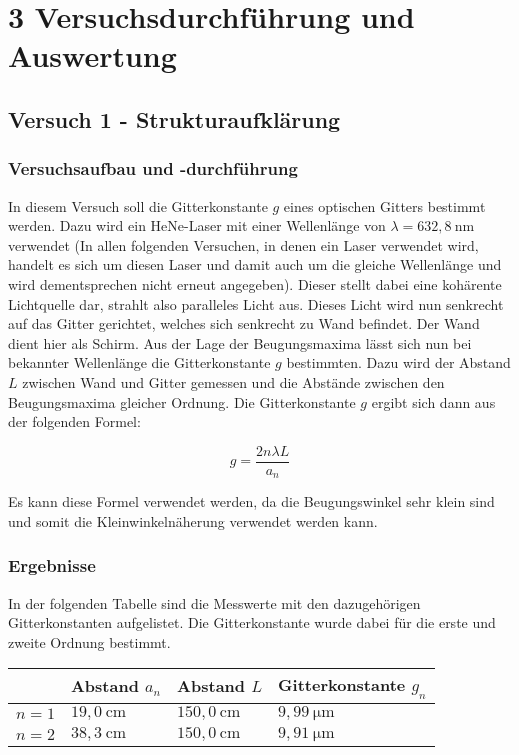 \chapter*{3 Versuchsdurchführung und Auswertung}
\setcounter{chapter}{3}
\setcounter{section}{0}
\setcounter{subsection}{0}

\section{Versuch 1 - Strukturaufklärung}

    \subsection{Versuchsaufbau und -durchführung}

        In diesem Versuch soll die Gitterkonstante $g$ eines optischen Gitters bestimmt werden. Dazu wird ein HeNe-Laser mit einer Wellenlänge von $\lambda = 632,8\ \mathrm{nm}$ verwendet (In allen folgenden Versuchen, in denen ein Laser verwendet wird, handelt es sich um diesen Laser und damit auch um die gleiche Wellenlänge und wird dementsprechen nicht erneut angegeben). Dieser stellt dabei eine kohärente Lichtquelle dar, strahlt also paralleles Licht aus. Dieses
        Licht wird nun senkrecht auf das Gitter gerichtet, welches sich senkrecht zu Wand befindet. Der Wand dient hier als Schirm. Aus der Lage der Beugungsmaxima lässt sich nun bei bekannter Wellenlänge die Gitterkonstante $g$ bestimmten. Dazu wird der Abstand $L$ zwischen Wand und Gitter gemessen und die Abstände zwischen den Beugungsmaxima gleicher Ordnung. Die Gitterkonstante $g$ ergibt sich dann aus der folgenden Formel:

        $$g = \frac{2 n \lambda L}{a_{n}}$$

        Es kann diese Formel verwendet werden, da die Beugungswinkel sehr klein sind und somit die Kleinwinkelnäherung verwendet werden kann.
    
    \subsection{Ergebnisse}

        In der folgenden Tabelle sind die Messwerte mit den dazugehörigen Gitterkonstanten aufgelistet. Die Gitterkonstante wurde dabei für die erste und zweite Ordnung bestimmt.

        \begin{table}[H]
            \centering
            \begin{tabular}{|l|l|l|l|}
                \hline
                & Abstand $a_{n}$ & Abstand $L$ & Gitterkonstante $g_{n}$\\
                \hline
                $n = 1$ & $19,0\ \mathrm{cm}$ & $150,0\ \mathrm{cm}$ & $9,99\ \mathrm{\mu m}$\\
                \hline
                $n = 2$ & $38,3\ \mathrm{cm}$ & $150,0\ \mathrm{cm}$ & $9,91\ \mathrm{\mu m}$\\
                \hline
            \end{tabular}
        \end{table}

